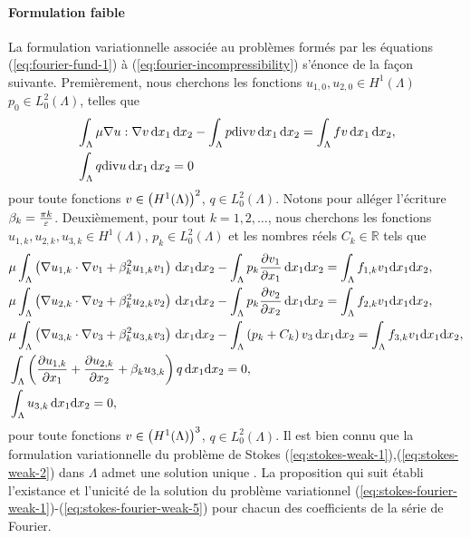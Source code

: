 \paragraph{Formulation faible}\label{sec:stokes-fourier-weak}
La formulation variationnelle associée au problèmes formés par les
équations (\ref{eq:fourier-fund-1}) à
(\ref{eq:fourier-incompressibility}) s'énonce de la façon
suivante. Premièrement, nous cherchons les fonctions $u_{1,0},u_{2,0} \in
H^1(\Lambda)$ $p_0 \in L^2_0(\Lambda)$, telles
que
\begin{align}
&\int_\Lambda \mu \nabla u : \nabla v \,\mathrm dx_1\,\mathrm dx_2 -
\int_\Lambda p\mathrm{div} v \,\mathrm dx_1\,\mathrm dx_2 = \int_\Lambda f v
\,\mathrm dx_1\,\mathrm dx_2,\label{eq:stokes-weak-1}\\
&\int_\Lambda q\mathrm{div} u \,\mathrm dx_1\,\mathrm dx_2 = 0\label{eq:stokes-weak-2}
\end{align}
pour toute fonctions $v \in \left( H^1(\Lambda) \right)^2$, $q \in
L_0^2(\Lambda)$. Notons pour alléger l'écriture $\beta_k = \frac{\pi
  k}{\varepsilon}$. Deuxièmement, pour tout $k = 1, 2, \dots$, nous cherchons les
fonctions $u_{1,k},u_{2,k},u_{3,k} \in H^1(\Lambda)$, $p_k \in
L_0^2(\Lambda)$ et les nombres réels $C_k\in\mathbb R$ tels que
\begin{align}
  &\electrolyteviscosity \int_\Lambda \parent{\nabla u_{1,k}\cdot \nabla v_1 %
                           + \beta_k^2 u_{1,k}v_1}\,\mathrm dx_1\mathrm dx_2 %
  - \int_\Lambda p_k\frac{\partial v_1}{\partial x_1}\,\mathrm dx_1\mathrm dx_2 %
  = \int_\Lambda f_{1,k}v_1\mathrm dx_1\mathrm dx_2, \label{eq:stokes-fourier-weak-1}\\
  &\electrolyteviscosity \int_\Lambda \parent{\nabla u_{2,k}\cdot \nabla v_2 %
                           + \beta_k^2 u_{2,k}v_2}\,\mathrm dx_1\mathrm dx_2 %
  - \int_\Lambda p_k\frac{\partial v_2}{\partial x_2}\,\mathrm dx_1\mathrm dx_2 %
  = \int_\Lambda f_{2,k}v_1\mathrm dx_1\mathrm dx_2, \label{eq:stokes-fourier-weak-2}\\
  &\electrolyteviscosity \int_\Lambda \parent{\nabla u_{3,k}\cdot \nabla v_3 %
                           + \beta_k^2 u_{3,k}v_3}\,\mathrm dx_1\mathrm dx_2 %
  - \int_\Lambda \parent{p_k + C_k}v_3\,\mathrm dx_1\mathrm dx_2 %
  = \int_\Lambda f_{3,k}v_1\mathrm dx_1\mathrm dx_2, \label{eq:stokes-fourier-weak-3}\\
  &\int_\Lambda \parent{\frac{\partial u_{1,k}}{\partial x_1} %
                       + \frac{\partial u_{2,k}}{\partial x_2} + \beta_k u_{3,k}}q\,\mathrm dx_1\mathrm dx_2 %
  = 0,\label{eq:stokes-fourier-weak-4}\\
  &\int_\Lambda u_{3,k}\,\mathrm dx_1\mathrm dx_2 %
  = 0, \label{eq:stokes-fourier-weak-5}
\end{align}
pour toute fonctions $v \in \left( H^1(\Lambda) \right)^3$, $q \in
L_0^2(\Lambda)$. Il est bien connu que la formulation variationnelle
du problème de Stokes
(\ref{eq:stokes-weak-1}),(\ref{eq:stokes-weak-2}) dans $\Lambda$ admet
une solution unique \cite{}. La proposition qui suit établi l'existance et
l'unicité de la solution du problème variationnel
(\ref{eq:stokes-fourier-weak-1})-(\ref{eq:stokes-fourier-weak-5}) pour
chacun des coefficients de la série de Fourier.

